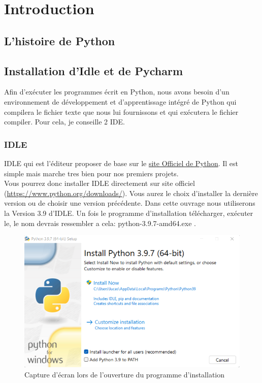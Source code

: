 \part{Introduction}

\chapter{L'histoire de Python} \label{sec:Histoire}



\chapter{Installation d'Idle et de Pycharm} \label{sec:Installation}

Afin d'exécuter les programmes écrit en Python, nous avons besoin d'un environnement de développement et d'apprentissage intégré de Python qui compilera le fichier texte que nous lui fournissons et qui exécutera le fichier compiler. Pour cela, je conseille 2 IDE.

\section*{IDLE} 
IDLE qui est l'éditeur proposer de base sur le \href{https://www.python.org/}{site Officiel de Python}. Il est simple mais marche tres bien pour nos premiers projets.\\

Vous pourrez donc installer IDLE directement sur site officiel (\url{https://www.python.org/downloads/}). 
Vous aurez le choix d'installer la dernière version ou de choisir une version précédente. Dans cette ouvrage nous utiliserons la Version 3.9 d'IDLE. 
Un fois le programme d'installation télécharger, exécuter le, le nom devrais ressembler a cela: python-3.9.7-amd64.exe .

\begin{figure}[H]
\includegraphics[scale=0.5]{instalationIDLE}
\caption{Capture d'écran lors de l'ouverture du programme d'installation}
\end{figure}

